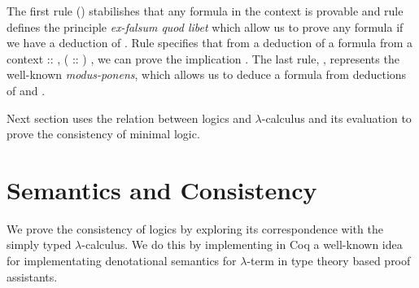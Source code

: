 The first rule () stabilishes that any formula in the context is provable and rule  defines
the principle \emph{ex-falsum quod libet} which allow us to prove any formula if we have a deduction of .
Rule  specifies that from a deduction of a formula  from a context  :: ,  ( :: ) ,
we can prove the implication   . The last rule, , represents the well-known \emph{modus-ponens},
which allows us to deduce a formula  from deductions of    and .


Next section uses the relation between logics and $\lambda$-calculus and its evaluation to prove the consistency of
minimal logic.
\begin{coqdoccode}
\coqdocemptyline
\coqdocemptyline
\end{coqdoccode}
 \section{Semantics and Consistency}\label{sec:semantics}


We prove the consistency of logics by exploring its correspondence with the simply typed
$\lambda$-calculus. We do this by implementing in Coq a well-known idea ~\cite{Augustsson99anexercise}
for implementating denotational semantics for $\lambda$-term in type theory based proof assistants.


